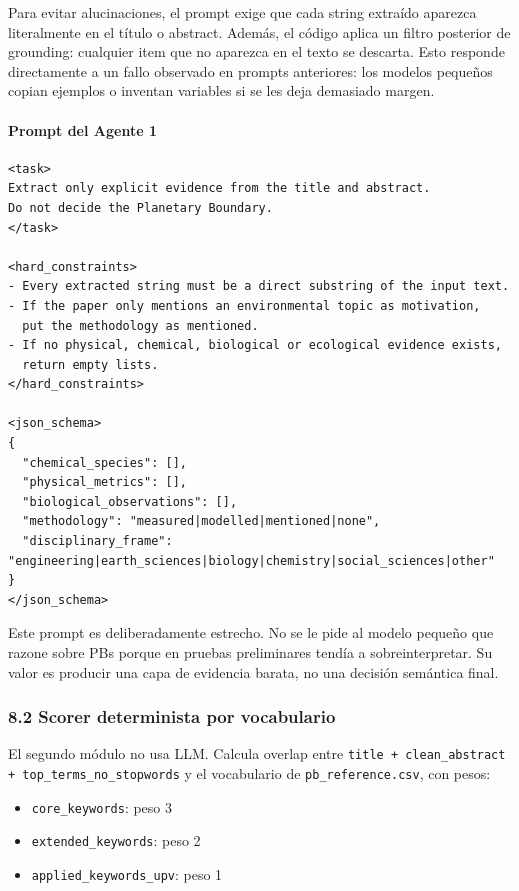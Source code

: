 Para evitar alucinaciones, el prompt exige que cada string extraído aparezca literalmente en el título o abstract. Además, el código aplica un filtro posterior de grounding: cualquier item que no aparezca en el texto se descarta. Esto responde directamente a un fallo observado en prompts anteriores: los modelos pequeños copian ejemplos o inventan variables si se les deja demasiado margen.

\paragraph{Prompt del Agente 1}

{\footnotesize
\begin{verbatim}
<task>
Extract only explicit evidence from the title and abstract.
Do not decide the Planetary Boundary.
</task>

<hard_constraints>
- Every extracted string must be a direct substring of the input text.
- If the paper only mentions an environmental topic as motivation,
  put the methodology as mentioned.
- If no physical, chemical, biological or ecological evidence exists,
  return empty lists.
</hard_constraints>

<json_schema>
{
  "chemical_species": [],
  "physical_metrics": [],
  "biological_observations": [],
  "methodology": "measured|modelled|mentioned|none",
  "disciplinary_frame": "engineering|earth_sciences|biology|chemistry|social_sciences|other"
}
</json_schema>
\end{verbatim}
}

Este prompt es deliberadamente estrecho. No se le pide al modelo pequeño que razone sobre PBs porque en pruebas preliminares tendía a sobreinterpretar. Su valor es producir una capa de evidencia barata, no una decisión semántica final.

\subsubsection{8.2 Scorer determinista por vocabulario}

El segundo módulo no usa LLM. Calcula overlap entre \texttt{title + clean\_abstract + top\_terms\_no\_stopwords} y el vocabulario de \texttt{pb\_reference.csv}, con pesos:

\begin{itemize}
\item \texttt{core\_keywords}: peso 3
\item \texttt{extended\_keywords}: peso 2
\item \texttt{applied\_keywords\_upv}: peso 1
\end{itemize}

